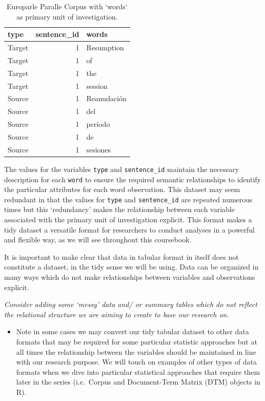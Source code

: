 \documentclass[
]{article}
\newenvironment{rmdblock}[1]
  {\begin{shaded*}
  \begin{itemize}
  \renewcommand{\labelitemi}{
    \raisebox{-.5\height}[0pt][0pt]{
      {\setkeys{Gin}{width=2em,keepaspectratio}\texttt{[image: assets/images/\#1]}}
    }
  }
  \item
  }
  {
  \end{itemize}
  \end{shaded*}
  }
\newenvironment{rmdtip}
  {\begin{rmdblock}{tip}}
  {\end{rmdblock}}
\begin{document}
\begin{table}

\caption{\label{tab:tidy-words-europarle}Europarle Paralle Corpus with `words` as primary unit of investigation.}
\centering
\begin{tabular}[t]{lrl}
\toprule
type & sentence\_id & words\\
\midrule
Target & 1 & Resumption\\
Target & 1 & of\\
Target & 1 & the\\
Target & 1 & session\\
Source & 1 & Reanudación\\
\addlinespace
Source & 1 & del\\
Source & 1 & período\\
Source & 1 & de\\
Source & 1 & sesiones\\
\bottomrule
\end{tabular}
\end{table}

The values for the variables \texttt{type} and \texttt{sentence\_id} maintain the necessary description for each \texttt{word} to ensure the required semantic relationships to identify the particular attributes for each word observation. This dataset may seem redundant in that the values for \texttt{type} and \texttt{sentence\_id} are repeated numerous times but this `redundancy' makes the relationship between each variable associated with the primary unit of investigation explicit. This format makes a tidy dataset a versatile format for researchers to conduct analyses in a powerful and flexible way, as we will see throughout this coursebook.

It is important to make clear that data in tabular format in itself does not constitute a dataset, in the tidy sense we will be using. Data can be organized in many ways which do not make relationships between variables and observations explicit.

\emph{Consider adding some `messy' data and/ or summary tables which do not reflect the relational structure we are aiming to create to base our research on.}

\begin{rmdtip}
Note in some cases we may convert our tidy tabular dataset to other data
formats that may be required for some particular statistic approaches
but at all times the relationship between the variables should be
maintained in line with our research purpose. We will touch on examples
of other types of data formats when we dive into particular statistical
approaches that require them later in the series (i.e.~Corpus and
Document-Term Matrix (DTM) objects in R).
\end{rmdtip}
\end{document}

